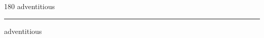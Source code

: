 
\begin{frame}
\begin{center}
\begin{turn}{180}
{\fontsize{2.5cm}{1em}\selectfont adventitious}
\end{turn}
\vspace{1em}\par  
\hrule
\vspace{1em}\par  
{\fontsize{2.5cm}{1em}\selectfont adventitious}
\end{center}
\end{frame}
